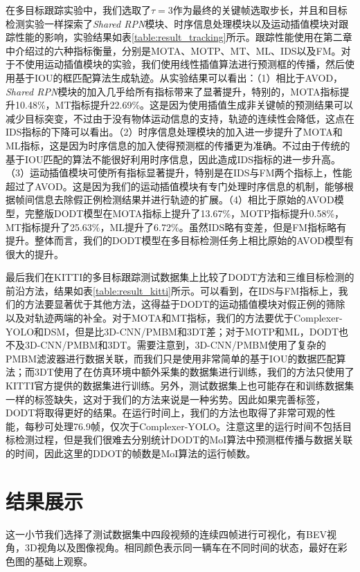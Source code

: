 在多目标跟踪实验中，我们选取了$\tau = 3$作为最终的关键帧选取步长，并且和目标检测实验一样探索了\textit{Shared RPN}模块、时序信息处理模块以及运动插值模块对跟踪性能的影响，实验结果如表\ref{table:result_tracking}所示。跟踪性能使用在第二章中介绍过的六种指标衡量，分别是MOTA、MOTP、MT、ML、IDS以及FM。对于不使用运动插值模块的实验，我们使用线性插值算法进行预测框的传播，然后使用基于IOU的框匹配算法生成轨迹。从实验结果可以看出：（1）相比于AVOD，\textit{Shared RPN}模块的加入几乎给所有指标带来了显著提升，特别的，MOTA指标提升10.48\%，MT指标提升22.69\%。这是因为使用插值生成非关键帧的预测结果可以减少目标突变，不过由于没有物体运动信息的支持，轨迹的连续性会降低，这点在IDS指标的下降可以看出。（2）时序信息处理模块的加入进一步提升了MOTA和ML指标，这是因为时序信息的加入使得预测框的传播更为准确。不过由于传统的基于IOU匹配的算法不能很好利用时序信息，因此造成IDS指标的进一步升高。（3）运动插值模块可使所有指标显著提升，特别是在IDS与FM两个指标上，性能超过了AVOD。这是因为我们的运动插值模块有专门处理时序信息的机制，能够根据帧间信息去除假正例检测结果并进行轨迹的扩展。（4）相比于原始的AVOD模型，完整版DODT模型在MOTA指标上提升了13.67\%，MOTP指标提升0.58\%，MT指标提升了25.63\%，ML提升了6.72\%。虽然IDS略有变差，但是FM指标略有提升。整体而言，我们的DODT模型在多目标检测任务上相比原始的AVOD模型有很大的提升。



最后我们在KITTI的多目标跟踪测试数据集上比较了DODT方法和三维目标检测的前沿方法，结果如表\ref{table:result_kitti}所示。可以看到，在IDS与FM指标上，我们的方法要显著优于其他方法，这得益于DODT的运动插值模块对假正例的筛除以及对轨迹两端的补全。对于MOTA和MT指标，我们的方法要优于Complexer-YOLO和DSM，但是比3D-CNN/PMBM和3DT差；对于MOTP和ML，DODT也不及3D-CNN/PMBM和3DT。需要注意到，3D-CNN/PMBM使用了复杂的PMBM滤波器进行数据关联，而我们只是使用非常简单的基于IOU的数据匹配算法；而3DT使用了在仿真环境中额外采集的数据集进行训练，我们的方法只使用了KITTI官方提供的数据集进行训练。另外，测试数据集上也可能存在和训练数据集一样的标签缺失，这对于我们的方法来说是一种劣势。因此如果完善标签，DODT将取得更好的结果。在运行时间上，我们的方法也取得了非常可观的性能，每秒可处理76.9帧，仅次于Complexer-YOLO。注意这里的运行时间不包括目标检测过程，但是我们很难去分别统计DODT的MoI算法中预测框传播与数据关联的时间，因此这里的DDOT的帧数是MoI算法的运行帧数。

\section{结果展示}
\label{show}
这一小节我们选择了测试数据集中四段视频的连续四帧进行可视化，有BEV视角，3D视角以及图像视角。相同颜色表示同一辆车在不同时间的状态，最好在彩色图的基础上观察。

